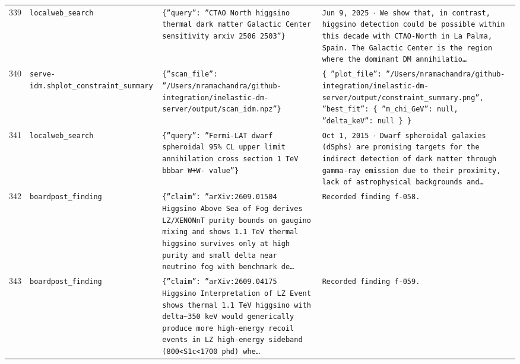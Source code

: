 \documentclass[11pt,a4paper]{article}
\begin{document}
\begin{longtable}{@{}p{}p{}p{}p{}@{}}
339 & \texttt{local}\newline\texttt{web\_\allowbreak{}search} & \texttt{\{''query'':\allowbreak{} ''CTAO North higgsino thermal dark matter Galactic Center sensitivity arxiv 2506 2503''\}\allowbreak{}} & \texttt{Jun 9,\allowbreak{} 2025 $\cdot$ We show that,\allowbreak{} in contrast,\allowbreak{} higgsino detection could be possible within this decade with CTAO-North in La Palma,\allowbreak{} Spain. The Galactic Center is the region where the dominant DM annihilatio\ldots{}\allowbreak{}} \\
340 & \texttt{serve-idm.sh}\newline\texttt{plot\_\allowbreak{}constraint\_\allowbreak{}summary} & \texttt{\{''scan\_\allowbreak{}file'':\allowbreak{} ''/\allowbreak{}Users/\allowbreak{}nramachandra/\allowbreak{}github-integration/\allowbreak{}inelastic-dm-server/\allowbreak{}output/\allowbreak{}scan\_\allowbreak{}idm.npz''\}\allowbreak{}} & \texttt{\{   ''plot\_\allowbreak{}file'':\allowbreak{} ''/\allowbreak{}Users/\allowbreak{}nramachandra/\allowbreak{}github-integration/\allowbreak{}inelastic-dm-server/\allowbreak{}output/\allowbreak{}constraint\_\allowbreak{}summary.png'',\allowbreak{}   ''best\_\allowbreak{}fit'':\allowbreak{} \{     ''m\_\allowbreak{}chi\_\allowbreak{}GeV'':\allowbreak{} null,\allowbreak{}     ''delta\_\allowbreak{}keV'':\allowbreak{} null   \}\allowbreak{} \}\allowbreak{}} \\
341 & \texttt{local}\newline\texttt{web\_\allowbreak{}search} & \texttt{\{''query'':\allowbreak{} ''Fermi-LAT dwarf spheroidal 95\% CL upper limit annihilation cross section 1 TeV bbbar W+W- value''\}\allowbreak{}} & \texttt{Oct 1,\allowbreak{} 2015 $\cdot$ Dwarf spheroidal galaxies (dSphs)\allowbreak{} are promising targets for the indirect detection of dark matter through gamma-ray emission due to their proximity,\allowbreak{} lack of astrophysical backgrounds and\ldots{}\allowbreak{}} \\
342 & \texttt{board}\newline\texttt{post\_\allowbreak{}finding} & \texttt{\{''claim'':\allowbreak{} ''arXiv:\allowbreak{}2609.01504 Higgsino Above Sea of Fog derives LZ/\allowbreak{}XENONnT purity bounds on gaugino mixing and shows 1.1 TeV thermal higgsino survives only at high purity and small delta near neutrino fog with benchmark de\ldots{}\allowbreak{}} & \texttt{Recorded finding f-058.} \\
343 & \texttt{board}\newline\texttt{post\_\allowbreak{}finding} & \texttt{\{''claim'':\allowbreak{} ''arXiv:\allowbreak{}2609.04175 Higgsino Interpretation of LZ Event shows thermal 1.1 TeV higgsino with delta\textasciitilde{}\allowbreak{}350 keV would generically produce more high-energy recoil events in LZ high-energy sideband (800\textless{}\allowbreak{}S1c\textless{}\allowbreak{}1700 phd)\allowbreak{} whe\ldots{}\allowbreak{}} & \texttt{Recorded finding f-059.} \\

\end{longtable}
\end{document}
